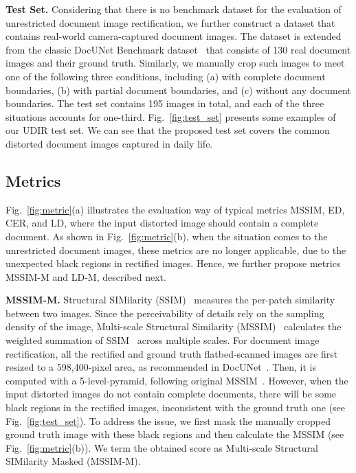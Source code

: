 \documentclass[lettersize,journal]{IEEEtran}
\begin{document}
\smallskip
\textbf{Test Set.}
Considering that there is no benchmark dataset for the evaluation of unrestricted document image rectification, we further construct a dataset that contains real-world camera-captured document images.
The dataset is extended from the classic DocUNet Benchmark dataset~\cite{8578592} that consists of 130 real document images and their ground truth.
Similarly, we manually crop such images to meet one of the following three conditions, including (a) with complete document boundaries, (b) with partial document boundaries, and (c) without any document boundaries.
The test set contains 195 images in total, and each of the three situations accounts for one-third.
Fig.~\ref{fig:test_set} presents some examples of our UDIR test set. We can see that the proposed test set covers the common distorted document images captured in daily life.




\subsection{Metrics}
Fig.~\ref{fig:metric}(a) illustrates the evaluation way of typical metrics MSSIM, ED, CER, and LD, where the input distorted image should contain a complete document.
As shown in Fig.~\ref{fig:metric}(b), when the situation comes to the unrestricted document images, 
these metrics are no longer applicable, due to the unexpected black regions in rectified images.
Hence, we further propose metrics MSSIM-M and LD-M, described next.                                                                        


\smallskip
\textbf{MSSIM-M.} Structural SIMilarity (SSIM)~\cite{1284395} measures the per-patch similarity between two images. 
Since the perceivability of details rely on the sampling density of the image, Multi-scale Structural Similarity (MSSIM)~\cite{1292216} calculates the weighted summation of SSIM~\cite{1284395} across multiple scales. For document image rectification, all the rectified and ground truth flatbed-scanned images are first resized to a 598,400-pixel area, as recommended in DocUNet~\cite{8578592}.
Then, it is computed with a 5-level-pyramid, 
following original MSSIM~\cite{1292216}. 
However, when the input distorted images do not contain complete documents, there will be some black regions in the rectified images, inconsistent with the ground truth one (see Fig.~\ref{fig:test_set}). To address the issue, we first mask the manually cropped ground truth image with these black regions and then calculate the MSSIM (see Fig.~\ref{fig:metric}(b)).
We term the obtained score as Multi-scale Structural SIMilarity Masked (MSSIM-M).
\end{document}
